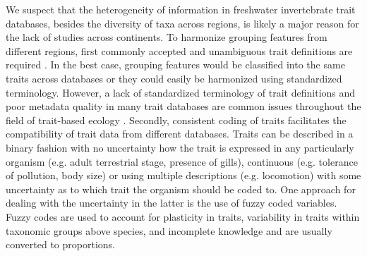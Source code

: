\documentclass{article}
\begin{document}
We suspect that the heterogeneity of information in freshwater invertebrate trait databases, besides the diversity of taxa across regions, is likely a major reason for the lack of studies across continents. To harmonize grouping features from different regions, first commonly accepted and unambiguous trait definitions are required \cite{schneider_towards_2019}. In the best case, grouping features would be classified into the same traits across databases or they could easily be harmonized using standardized terminology. However, a lack of standardized terminology of trait definitions and poor metadata quality in many trait databases are common issues throughout the field of trait-based ecology \cite{baird_toward_2011, schneider_towards_2019}. Secondly, consistent coding of traits facilitates the compatibility of trait data from different databases. 
Traits can be described in a binary fashion with no uncertainty how the trait is expressed in any particularly organism (e.g. adult terrestrial stage, presence of gills), continuous (e.g. tolerance of pollution, body size) or using multiple descriptions (e.g. locomotion) with some uncertainty as to which trait the organism should be coded to. One approach for dealing with the uncertainty in the latter is the use of fuzzy coded variables. Fuzzy codes are used to account for plasticity in traits, variability in traits within taxonomic groups above species, and incomplete knowledge and are usually converted to proportions.
\end{document}

